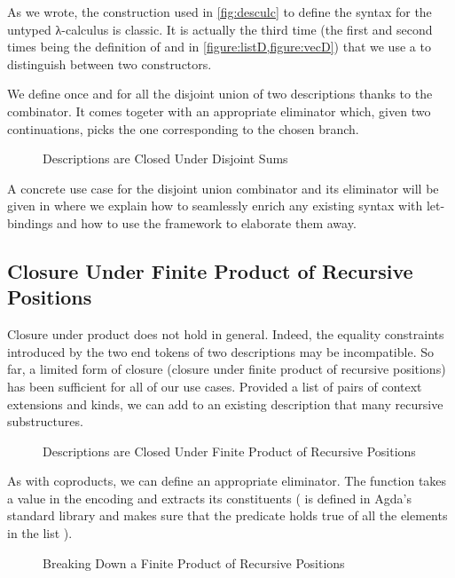 As we wrote, the construction used in \cref{fig:desculc} to define the
syntax for the untyped λ-calculus is classic. It is actually the third
time (the first and second times being the definition of  and
 in \cref{figure:listD,figure:vecD}) that we use a 
to distinguish between two constructors.

We define once and for all the disjoint union of two descriptions thanks
to the  combinator. It comes togeter with an appropriate
eliminator  which, given two continuations, picks the one
corresponding to the chosen branch.

\begin{figure}[h]
\caption{Descriptions are Closed Under Disjoint Sums\label{figure:descsum}}
\end{figure}

A concrete use case for the disjoint union combinator and its eliminator
will be given in  where we explain how to seamlessly
enrich any existing syntax with let-bindings and how to use the 
framework to elaborate them away.

\subsection{Closure Under Finite Product of Recursive Positions}

Closure under product does not hold in general. Indeed, the equality constraints
introduced by the two end tokens of two descriptions may be incompatible. So far,
a limited form of closure (closure under finite product of recursive positions)
has been sufficient for all of our use cases. Provided a list of pairs of context
extensions and kinds, we can add to an existing description that many recursive
substructures.

\begin{figure}[h]
\caption{Descriptions are Closed Under Finite Product of Recursive Positions\label{figure:descprod}}
\end{figure}

As with coproducts, we can define an appropriate eliminator. The function 
takes a value in the encoding and extracts its constituents ({  }
is defined in Agda's standard library and makes sure that the predicate  holds
true of all the elements in the list ).

\begin{figure}[h]
\caption{Breaking Down a Finite Product of Recursive Positions\label{figure:descprodelim}}
\end{figure}
